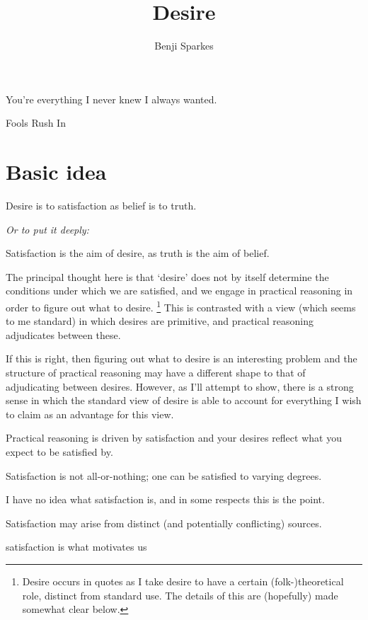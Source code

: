 \documentclass[10pt]{article}
\title{Desire}
\author{Benji Sparkes}
\begin{document}
\maketitle
\epigraph{You're everything I never knew I always wanted.}{Fools Rush In}



\section{Basic idea}
\label{sec:basic-idea}


\begin{center}
  Desire is to satisfaction as belief is to truth.

  \emph{Or to put it deeply:}

  Satisfaction is the aim of desire, as truth is the aim of belief.
\end{center}

The principal thought here is that `desire' does not by itself determine the conditions under which we are satisfied, and we engage in practical reasoning in order to figure out what to desire.\nolinebreak
\footnote{Desire occurs in quotes as I take desire to have a certain (folk-)theoretical role, distinct from standard use.
  The details of this are (hopefully) made somewhat clear below.}
This is contrasted with a view (which seems to me standard) in which desires are primitive, and practical reasoning adjudicates between these.

If this is right, then figuring out what to desire is an interesting problem and the structure of practical reasoning may have a different shape to that of adjudicating between desires.
However, as I'll attempt to show, there is a strong sense in which the standard view of desire is able to account for everything I wish to claim as an advantage for this view.

\begin{description}[nosep]
\item[Basic idea] Practical reasoning is driven by satisfaction and your desires reflect what you expect to be satisfied by.
\item[X] Satisfaction is not all-or-nothing; one can be satisfied to varying degrees.
\item[Y] I have no idea what satisfaction is, and in some respects this is the point.
\item[Z] Satisfaction may arise from distinct (and potentially conflicting) sources.
\item[a] satisfaction is what motivates us
\end{description}
\end{document}

